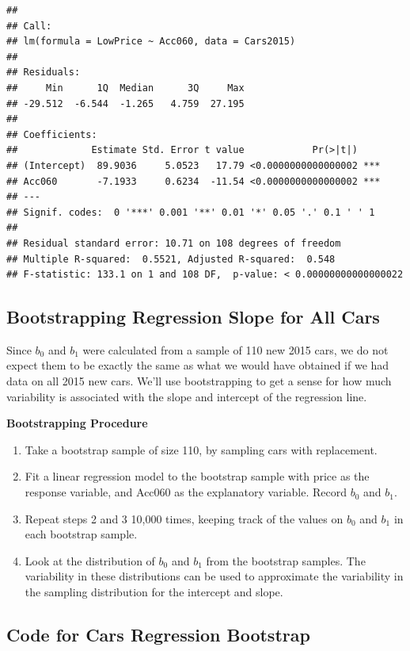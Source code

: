 \documentclass[]{book}
\begin{document}
\begin{verbatim}
## 
## Call:
## lm(formula = LowPrice ~ Acc060, data = Cars2015)
## 
## Residuals:
##     Min      1Q  Median      3Q     Max 
## -29.512  -6.544  -1.265   4.759  27.195 
## 
## Coefficients:
##             Estimate Std. Error t value            Pr(>|t|)    
## (Intercept)  89.9036     5.0523   17.79 <0.0000000000000002 ***
## Acc060       -7.1933     0.6234  -11.54 <0.0000000000000002 ***
## ---
## Signif. codes:  0 '***' 0.001 '**' 0.01 '*' 0.05 '.' 0.1 ' ' 1
## 
## Residual standard error: 10.71 on 108 degrees of freedom
## Multiple R-squared:  0.5521, Adjusted R-squared:  0.548 
## F-statistic: 133.1 on 1 and 108 DF,  p-value: < 0.00000000000000022
\end{verbatim}

\subsection{Bootstrapping Regression Slope for All
Cars}\label{bootstrapping-regression-slope-for-all-cars}

Since \(b_0\) and \(b_1\) were calculated from a sample of 110 new 2015
cars, we do not expect them to be exactly the same as what we would have
obtained if we had data on all 2015 new cars. We'll use bootstrapping to
get a sense for how much variability is associated with the slope and
intercept of the regression line.

\textbf{Bootstrapping Procedure}

\begin{enumerate}
\def\labelenumi{\arabic{enumi}.}
\item
  Take a bootstrap sample of size 110, by sampling cars with
  replacement.
\item
  Fit a linear regression model to the bootstrap sample with price as
  the response variable, and Acc060 as the explanatory variable. Record
  \(b_0\) and \(b_1\).
\item
  Repeat steps 2 and 3 10,000 times, keeping track of the values on
  \(b_0\) and \(b_1\) in each bootstrap sample.
\item
  Look at the distribution of \(b_0\) and \(b_1\) from the bootstrap
  samples. The variability in these distributions can be used to
  approximate the variability in the sampling distribution for the
  intercept and slope.
\end{enumerate}

\subsection{Code for Cars Regression
Bootstrap}\label{code-for-cars-regression-bootstrap}
\end{document}
